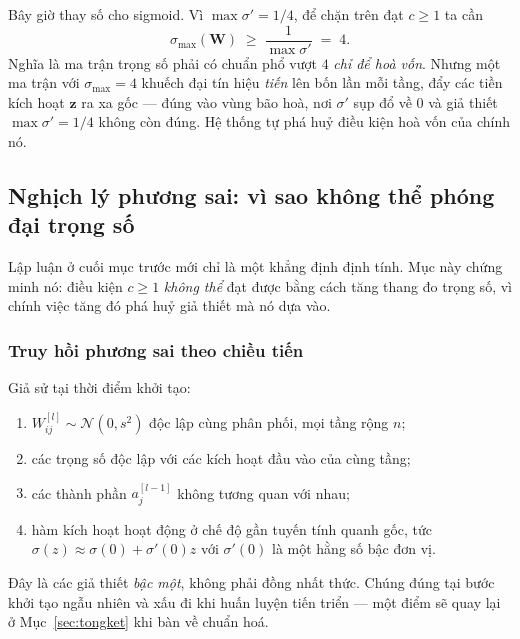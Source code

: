 Bây giờ thay số cho sigmoid. Vì $\max\sigma' = 1/4$, để chặn trên đạt $c \ge 1$
ta cần
\[
  \sigma_{\max}(\mathbf{W}) \;\ge\; \frac{1}{\max\sigma'} \;=\; 4 .
\]
Nghĩa là ma trận trọng số phải có chuẩn phổ vượt $4$ \emph{chỉ để hoà vốn}. Nhưng
một ma trận với $\sigma_{\max} = 4$ khuếch đại tín hiệu \emph{tiến} lên bốn lần
mỗi tầng, đẩy các tiền kích hoạt $\mathbf{z}$ ra xa gốc --- đúng vào vùng bão
hoà, nơi $\sigma'$ sụp đổ về $0$ và giả thiết $\max\sigma' = 1/4$ không còn
đúng. Hệ thống tự phá huỷ điều kiện hoà vốn của chính nó.

\subsection{Nghịch lý phương sai: vì sao không thể phóng đại trọng số}

Lập luận ở cuối mục trước mới chỉ là một khẳng định định tính. Mục này chứng minh
nó: điều kiện $c\ge1$ \emph{không thể} đạt được bằng cách tăng thang đo trọng số,
vì chính việc tăng đó phá huỷ giả thiết mà nó dựa vào.

\subsubsection{Truy hồi phương sai theo chiều tiến}

Giả sử tại thời điểm khởi tạo:
\begin{enumerate}[leftmargin=*, itemsep=1pt, label=(G\arabic*)]
  \item $W^{[l]}_{ij}\sim\mathcal{N}(0, s^2)$ độc lập cùng phân phối, mọi tầng
    rộng $n$;
  \item các trọng số độc lập với các kích hoạt đầu vào của cùng tầng;
  \item các thành phần $a^{[l-1]}_j$ không tương quan với nhau;
  \item hàm kích hoạt hoạt động ở chế độ gần tuyến tính quanh gốc, tức
    $\sigma(z)\approx\sigma(0) + \sigma'(0)z$ với $\sigma'(0)$ là một hằng số bậc
    đơn vị.
\end{enumerate}

Đây là các giả thiết \emph{bậc một}, không phải đồng nhất thức. Chúng đúng tại
bước khởi tạo ngẫu nhiên và xấu đi khi huấn luyện tiến triển --- một điểm sẽ
quay lại ở Mục~\ref{sec:tongket} khi bàn về chuẩn hoá.

